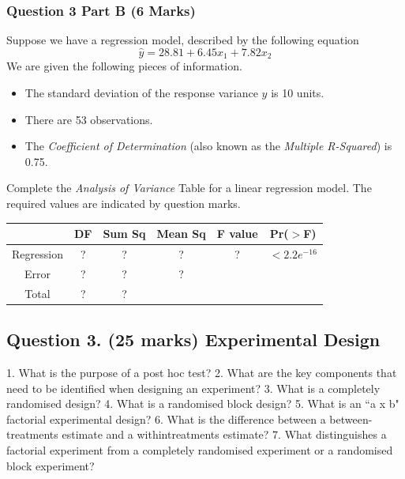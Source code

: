 \documentclass[a4paper,12pt]{article}
\begin{document}
\subsubsection*{Question 3 Part B (6 Marks)}
Suppose we have a regression model, described by the following equation
\[ \hat{y} = 28.81 + 6.45x_1 + 7.82 x_2\]
We are given the following pieces of information.
\begin{itemize}
	\item The standard deviation of the response variance $y$ is 10 units.
	\item There are 53 observations.
	\item The \textit{Coefficient of Determination} (also known as the \textit{Multiple R-Squared}) is 0.75.
\end{itemize}
Complete the \textit{Analysis of Variance} Table for a linear regression model.
The required values are indicated by question marks.

\begin{center}
	\begin{tabular}{|c|c|c|c|c|c|} \hline
		\phantom{makespace}	& DF & 	Sum Sq &	Mean Sq &	F value &   	Pr($>$F)    \\ \hline
		Regression &  \phantom{make}?\phantom{make} &	? &	? &	 ? &	$< 2.2e^{-16}$ \\ \hline
		Error  & ? &	? &  	?   &            &       \\ \hline
		Total  & ?  &	? &  \phantom{makespace}	  &   \phantom{makespace}         &    \phantom{makespace}    \\ \hline
	\end{tabular} 
\end{center}


\newpage


\large\subsection*{Question 3. (25 marks) Experimental Design }

1. What is the purpose of a post hoc test?
2. What are the key components that need to be identified when designing an
experiment?
3. What is a completely randomised design?
4. What is a randomised block design?
5. What is an ``a x b" factorial experimental design?
6. What is the difference between a between-treatments estimate and a withintreatments
estimate?
7. What distinguishes a factorial experiment from a completely randomised experiment or a randomised block experiment?
\end{document}
